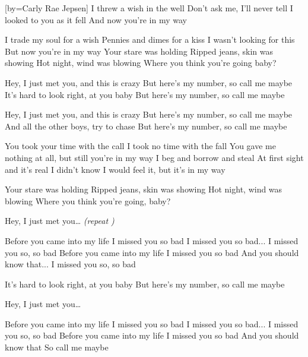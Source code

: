 [by={Carly Rae Jepsen}]
\beginverse
I threw a wish in the well 
Don't ask me, I'll never tell 
I looked to you as it fell 
And now you're in my way 
\endverse

\beginverse
I trade my soul for a wish 
Pennies and dimes for a kiss 
I wasn't looking for this 
But now you're in my way 
Your stare was holding 
Ripped jeans, skin was showing 
Hot night, wind was blowing 
Where you think you're going baby? 
\endverse 

\beginchorus
Hey, I just met you, and this is crazy 
But here's my number, so call me maybe 
It's hard to look right, at you baby 
But here's my number, so call me maybe
\endchorus

\beginchorus
Hey, I just met you, and this is crazy 
But here's my number, so call me maybe 
And all the other boys, try to chase 
But here's my number, so call me maybe 
\endchorus

\beginverse 
You took your time with the call 
I took no time with the fall 
You gave me nothing at all, but still you're in my way 
I beg and borrow and steal 
At first sight and it's real 
I didn't know I would feel it, but it's in my way 
\endverse

\beginverse 
Your stare was holding 
Ripped jeans, skin was showing 
Hot night, wind was blowing 
Where you think you're going, baby? 
\endverse

\beginchorus
Hey, I just met you\dots
\textit{(repeat )}
\endchorus
 
\beginverse
Before you came into my life I missed you so bad 
I missed you so bad... I missed you so, so bad 
Before you came into my life I missed you so bad 
And you should know that... I missed you so, so bad 
\endverse

\beginverse 
It's hard to look right, at you baby 
But here's my number, so call me maybe 
\endverse

\beginchorus
Hey, I just met you\dots
\endchorus

\beginverse 
Before you came into my life I missed you so bad 
I missed you so bad... I missed you so, so bad 
Before you came into my life I missed you so bad 
And you should know that 
So call me maybe
\endverse
\endsong